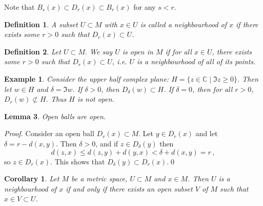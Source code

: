 \documentclass{article}
\theoremstyle{plain}\theoremheaderfont{\normalfont\itshape}\theorembodyfont{\rmfamily}\theoremseparator{.}\newtheorem*{rem}{Remark}\newtheorem*{ex}{Example}\newtheorem*{proof}{Proof}\newtheorem*{altp}{Alternative proof}
\theoremstyle{plain}\theoremheaderfont{\normalfont\bfseries}\theorembodyfont{\rmfamily}\theoremseparator{.}\newtheorem{thm}{Theorem}[section]\newtheorem{lem}[thm]{Lemma}\newtheorem{prop}[thm]{Proposition}\newtheorem*{cor}{Corollary}\newtheorem{defn}[thm]{Definition}\newtheorem{clm}[thm]{Claim}\newtheorem{clminproof}{Claim}
\theoremstyle{break}\theoremheaderfont{\normalfont\itshape}\theorembodyfont{\rmfamily}\theoremseparator{.\medskip}\newtheorem*{proofskip}{Proof}\newtheorem*{exs}{Examples}\newtheorem*{rems}{Remarks}
\theoremstyle{break}\theoremheaderfont{\normalfont\bfseries}\theorembodyfont{\rmfamily}\theoremseparator{.\medskip}\newtheorem{lemskip}[thm]{Lemma}\newtheorem{defnskip}[thm]{Definition}\newtheorem{propskip}[thm]{Proposition}\newtheorem{thmskip}[thm]{Theorem}
\newcommand{\qed}{\hfill\ensuremath{\Box}}
\begin{document}
    Note that \(B_s(x)\subset D_r(x)\subset B_r(x)\) for any \(s<r\).

    \begin{defn}
        A subset \(U\subset M\) with \(x\in U\) is called a \textit{neighbourhood} of \(x\) if there exists some \(r>0\) such that \(D_r(x)\subset U\).
    \end{defn}

    \begin{defn}
        Let \(U\subset M\). We say \(U\) is \textit{open} in \(M\) if for all \(x\in U\), there exists some \(r>0\) such that \(D_r(x)\subset U\), i.e. \(U\) is a neighbourhood of all of its points.
    \end{defn}

    \begin{ex}
        Consider the upper half complex plane: \(H=\{z\in\mathbb{C}\mid\Im z\ge 0\}\). Then let \(w\in H\) and \(\delta=\Im w\). If \(\delta>0\), then \(D_\delta(w)\subset H\). If \(\delta=0\), then for all \(r>0\), \(D_r(w)\not\subset H\). Thus \(H\) is not open.
    \end{ex}

    \begin{lem}
        Open balls are open.
    \end{lem}
    \begin{proof}
        Consider an open ball \(D_r(x)\subset M\). Let \(y\in D_r(x)\) and let \(\delta=r-d(x,y)\). Then \(\delta>0\), and if \(z\in D_\delta(y)\) then
        \[d(z,x)\le d(z,y)+d(y,x)<\delta+d(x,y)=r\,,\]
        so \(z\in D_r(x)\). This shows that \(D_\delta(y)\subset D_r(x)\).\qed
    \end{proof}

    \begin{cor}
        Let \(M\) be a metric space, \(U\subset M\) and \(x\in M\). Then \(U\) is a neighbourhood of \(x\) if and only if there exists an open subset \(V\) of \(M\) such that \(x\in V\subset U\).
    \end{cor}
\end{document}
